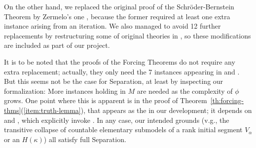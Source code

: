 On the other hand, we replaced the original proof of the
Schröder-Bernstein Theorem by Zermelo's one
\cite[Exr. x4.27]{moschovakis1994notes}, because the former required
at least one extra instance
arising from an iteration. We also managed to avoid 12 further
replacements by restructuring some of original theories in
, so these modifications are included as
part of our project.

It is to be noted that the proofs of the Forcing Theorems do not
require any extra replacement; actually, they only need the 7
instances appearing in  and
.  But this seems not be
the case for Separation, at least by inspecting our formalization:
More instances holding in $M$ are needed 
as the complexity of $\phi$ grows. One point where this is apparent is
in the proof of Theorem~\ref{th:forcing-thms}(\ref{item:truth-lemma}),
that appears as the  in our development; it
depends on  and
, which explicitly invoke
. In any case, our intended grounds
(v.g., the transitive collapse of countable elementary submodels of a
rank initial segment $V_\alpha$ or an $H(\kappa)$) all satisfy full
Separation.

